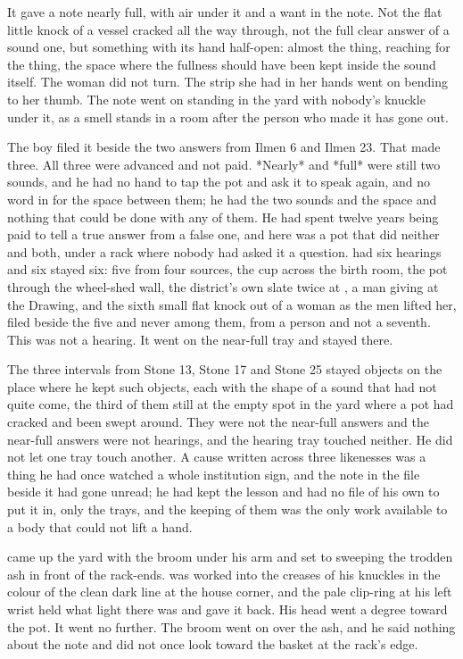 It gave a note nearly full, with air under it and a want in the note. Not the flat little knock of a vessel cracked all the way through, not the full clear answer of a sound one, but something with its hand half-open: almost the thing, reaching for the thing, the space where the fullness should have been kept inside the sound itself. The woman did not turn. The strip she had in her hands went on bending to her thumb. The note went on standing in the yard with nobody's knuckle under it, as a smell stands in a room after the person who made it has gone out.

The boy filed it beside the two answers from Ilmen 6 and Ilmen 23. That made three. All three were advanced and not paid. *Nearly* and *full* were still two sounds, and he had no hand to tap the pot and ask it to speak again, and no word in  for the space between them; he had the two sounds and the space and nothing that could be done with any of them. He had spent twelve years being paid to tell a true answer from a false one, and here was a pot that did neither and both, under a rack where nobody had asked it a question.  had six hearings and six stayed six: five from four sources, the cup across the birth room, the pot through the wheel-shed wall, the district's own slate twice at , a man giving at the Drawing, and the sixth small flat knock out of a woman as the men lifted her, filed beside the five and never among them, from a person and not a seventh. This was not a hearing. It went on the near-full tray and stayed there.

The three intervals from Stone 13, Stone 17 and Stone 25 stayed objects on the place where he kept such objects, each with the shape of a sound that had not quite come, the third of them still at the empty spot in the yard where a pot had cracked and been swept around. They were not the near-full answers and the near-full answers were not hearings, and the hearing tray touched neither. He did not let one tray touch another. A cause written across three likenesses was a thing he had once watched a whole institution sign, and the note in the file beside it had gone unread; he had kept the lesson and had no file of his own to put it in, only the trays, and the keeping of them was the only work available to a body that could not lift a hand.

 came up the yard with the broom under his arm and set to sweeping the trodden ash in front of the rack-ends.  was worked into the creases of his knuckles in the colour of the clean dark line at the house corner, and the pale clip-ring at his left wrist held what light there was and gave it back. His head went a degree toward the pot. It went no further. The broom went on over the ash, and he said nothing about the note and did not once look toward the basket at the rack's edge.

